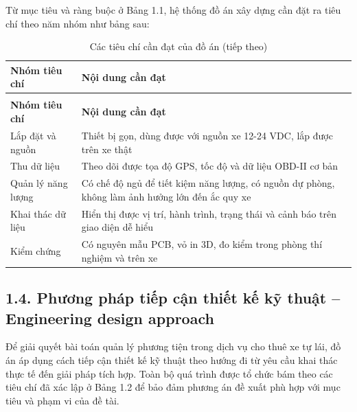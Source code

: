 \documentclass[a4paper]{extarticle}
\newcommand{\thesissettableid}[2]{%
  \renewcommand{\thetable}{#1}%
  \renewcommand{\theHtable}{#2}%
}
\begin{document}
Từ mục tiêu và ràng buộc ở Bảng 1.1, hệ thống đồ án xây dựng cần đặt ra tiêu chí theo năm nhóm như bảng sau:

{\thesissettableid{1.2}{condensed-r2-bang-1-2-cac-tieu-chi-can-dat-cua-do-an}
\def\LTcaptype{table}
\begin{longtable}{|L{(\linewidth - 2\tabcolsep) * }|L{(\linewidth - 2\tabcolsep) * }|}
\caption{Các tiêu chí cần đạt của đồ án}\label{tab:condensed-r2-bang-1-2-cac-tieu-chi-can-dat-cua-do-an}\\
\hline
\textbf{Nhóm tiêu chí} & \textbf{Nội dung cần đạt} \\
\hline
\endfirsthead
\caption[]{Các tiêu chí cần đạt của đồ án (tiếp theo)}\\
\hline
\textbf{Nhóm tiêu chí} & \textbf{Nội dung cần đạt} \\
\hline
\endhead
\endfoot
\endlastfoot
Lắp đặt và nguồn & Thiết bị gọn, dùng được với nguồn xe 12-24 VDC, lắp được trên xe thật \\\hline
Thu dữ liệu & Theo dõi được tọa độ GPS, tốc độ và dữ liệu OBD-II cơ bản \\\hline
Quản lý năng lượng & Có chế độ ngủ để tiết kiệm năng lượng, có nguồn dự phòng, không làm ảnh hưởng lớn đến ắc quy xe \\\hline
Khai thác dữ liệu & Hiển thị được vị trí, hành trình, trạng thái và cảnh báo trên giao diện dễ hiểu \\\hline
Kiểm chứng & Có nguyên mẫu PCB, vỏ in 3D, đo kiểm trong phòng thí nghiệm và trên xe \\\hline
\end{longtable}
}
\subsection{1.4. Phương pháp tiếp cận thiết kế kỹ thuật -- Engineering design approach}\label{phux1b0ux1a1ng-phuxe1p-tiux1ebfp-cux1eadn-thiux1ebft-kux1ebf-kux1ef9-thuux1eadt-engineering-design-approach}

Để giải quyết bài toán quản lý phương tiện trong dịch vụ cho thuê xe tự lái, đồ án áp dụng cách tiếp cận thiết kế kỹ thuật theo hướng đi từ yêu cầu khai thác thực tế đến giải pháp tích hợp. Toàn bộ quá trình được tổ chức bám theo các tiêu chí đã xác lập ở Bảng 1.2 để bảo đảm phương án đề xuất phù hợp với mục tiêu và phạm vi của đề tài.
\end{document}

